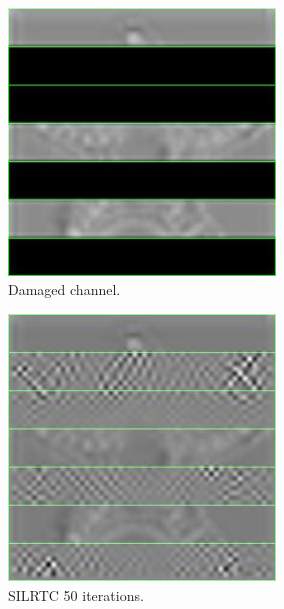 \documentclass[aspectratio=169]{beamer}
\begin{document}
\begin{frame}
\begin{figure}[H]
			\begin{subfigure}{.17\textwidth}
			\centering
			\includegraphics[width = 0.778\textwidth]{damagedchannel1scaled.jpg}
			\caption{Damaged channel.}
		\end{subfigure}%
		\hfill 
		\begin{subfigure}{.17\textwidth}
			\centering
			\includegraphics[width=0.778\textwidth]{silrtc50repairedchannel1scaled.jpg}
			\caption{SILRTC 50 iterations.}
		\end{subfigure}%
		\hfill
		\begin{subfigure}{.17\textwidth}
			\centering

\end{subfigure}
\end{figure}
\end{frame}
\end{document}
